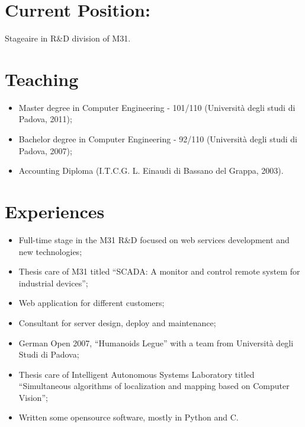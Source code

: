 \documentclass[pdftex, a4paper, 11pt]{article}
\begin{document}
\section*{Current Position:}

Stageaire in R\&D division of M31.



\section*{Teaching}
\begin{itemize}
\item Master degree in Computer Engineering - 101/110 (Universit\`a degli studi di Padova, 2011);
\item Bachelor degree in Computer Engineering - 92/110 (Universit\`a degli studi di Padova, 2007);
\item Accounting Diploma (I.T.C.G. L. Einaudi di Bassano del Grappa, 2003).
\end{itemize}

\section*{Experiences}
\begin{itemize}
\item Full-time stage in the M31 R\&D focused on web services development and new technologies;
\item Thesis care of M31 titled ``SCADA: A monitor and control remote system for industrial devices'';
\item Web application for different customers;
\item Consultant for server design, deploy and maintenance;
\item German Open 2007, ``Humanoids Legue'' with a team from Universit\`a
degli Studi di Padova;
\item Thesis care of Intelligent Autonomous Systems Laboratory titled ``Simultaneous
algorithms of localization and mapping based on Computer Vision'';
\item Written some opensource software, mostly in Python and C.
\end{itemize}
\end{document}
